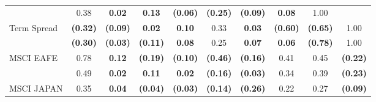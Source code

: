 \documentclass[12pt]{article}
\begin{document}
\begin{table}[H]
{\begin{tabular}{@{}lccccccccc@{}}
                      & {\color[HTML]{303498} 0.38}            & {\color[HTML]{303498} \textbf{0.02}}   & {\color[HTML]{303498} \textbf{0.13}}   & {\color[HTML]{303498} \textbf{(0.06)}} & {\color[HTML]{303498} \textbf{(0.25)}}                   & {\color[HTML]{303498} \textbf{(0.09)}} & {\color[HTML]{303498} \textbf{0.08}}                    & {\color[HTML]{303498} 1.00}                                 & \multicolumn{1}{l}{}                                  \\
Term Spread           & \textbf{(0.32)}                        & \textbf{(0.09)}                        & \textbf{0.02}                          & \textbf{0.10}                          & 0.33                                                     & \textbf{0.03}                          & \textbf{(0.60)}                                         & \textbf{(0.65)}                                             & 1.00                                                  \\
                      & {\color[HTML]{303498} \textbf{(0.30)}} & {\color[HTML]{303498} \textbf{(0.03)}} & {\color[HTML]{303498} \textbf{(0.11)}} & {\color[HTML]{303498} \textbf{0.08}}   & {\color[HTML]{303498} 0.25}                              & {\color[HTML]{303498} \textbf{0.07}}   & {\color[HTML]{303498} \textbf{0.06}}                    & {\color[HTML]{303498} \textbf{(0.78)}}                      & {\color[HTML]{303498} 1.00}                           \\ \midrule
MSCI EAFE             & 0.78                                   & \textbf{0.12}                          & \textbf{(0.19)}                        & \textbf{(0.10)}                        & \textbf{(0.46)}                                          & \textbf{(0.16)}                        & 0.41                                                    & 0.45                                                        & \textbf{(0.22)}                                       \\
                      & {\color[HTML]{303498} 0.49}            & {\color[HTML]{303498} \textbf{0.02}}   & {\color[HTML]{303498} \textbf{0.11}}   & {\color[HTML]{303498} \textbf{0.02}}   & {\color[HTML]{303498} \textbf{(0.16)}}                   & {\color[HTML]{303498} \textbf{(0.03)}} & {\color[HTML]{303498} 0.34}                             & {\color[HTML]{303498} 0.39}                                 & {\color[HTML]{303498} \textbf{(0.23)}}                \\
MSCI JAPAN            & 0.35                                   & \textbf{0.04}                          & \textbf{(0.04)}                        & \textbf{(0.03)}                        & \textbf{(0.14)}                                          & \textbf{(0.26)}                        & 0.22                                                    & 0.27                                                        & \textbf{(0.09)}                                       \\

\end{tabular}}
\end{table}
\end{document}
